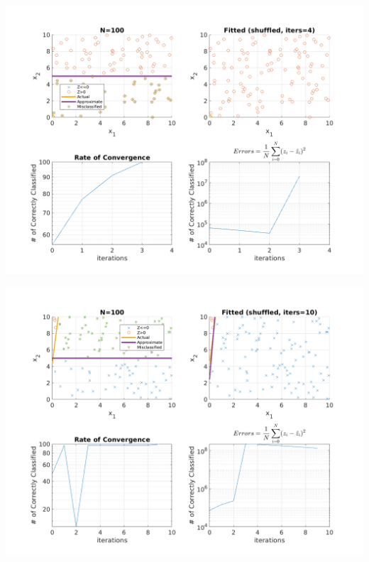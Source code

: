 \documentclass{article}
\newenvironment{Figure}
  {\par\medskip\noindent\minipage{\linewidth}}
  {\endminipage\par\medskip}
\begin{document}
\begin{multicols}{2}
\begin{Figure}
\end{Figure}
\begin{Figure}
\centering
\includegraphics[width=\linewidth]{pngs/n100_shuffled4.png}
\end{Figure}
\begin{Figure}
\centering
\includegraphics[width=\linewidth]{pngs/n100_shuffled5.png}
\end{Figure}


\end{multicols}
\end{document}
